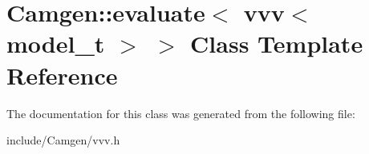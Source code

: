 \hypertarget{a00208}{\section{Camgen\-:\-:evaluate$<$ vvv$<$ model\-\_\-t $>$ $>$ Class Template Reference}
\label{a00208}
}


The documentation for this class was generated from the following file\-:\begin{DoxyCompactItemize}
\item 
include/\-Camgen/vvv.\-h\end{DoxyCompactItemize}
